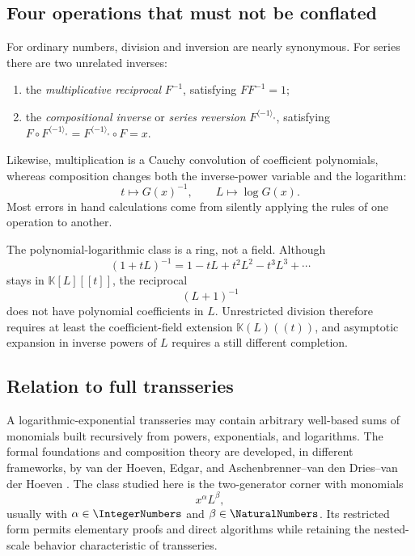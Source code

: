 \documentclass[11pt]{article}
\theoremstyle{pltheorem}
\newcommand{\K}{\mathbb K}
\newcommand{\rev}{\langle-1\rangle_{\circ}}
\newcommand{\compose}{\mathbin{\circ}}
\begin{document}
\subsection{Four operations that must not be conflated}

For ordinary numbers, division and inversion are nearly synonymous.  For series there are two unrelated inverses:
\begin{enumerate}[label=\textup{(\roman*)}]
\item the \emph{multiplicative reciprocal} \(F^{-1}\), satisfying \(F F^{-1}=1\);
\item the \emph{compositional inverse} or \emph{series reversion} \(F^{\rev}\), satisfying
\(F\compose F^{\rev}=F^{\rev}\compose F=x\).
\end{enumerate}
Likewise, multiplication is a Cauchy convolution of coefficient polynomials, whereas composition changes both the inverse-power variable and the logarithm:
\[
 t\mapsto G(x)^{-1},\qquad L\mapsto\log G(x).
\]
Most errors in hand calculations come from silently applying the rules of one operation to another.

\begin{warningbox}
The polynomial-logarithmic class is a ring, not a field.  Although
\[
 (1+tL)^{-1}=1-tL+t^2L^2-t^3L^3+\cdots
\]
stays in \(\K[L][[t]]\), the reciprocal
\[
 (L+1)^{-1}
\]
does not have polynomial coefficients in \(L\).  Unrestricted division therefore requires at least the coefficient-field extension \(\K(L)((t))\), and asymptotic expansion in inverse powers of \(L\) requires a still different completion.
\end{warningbox}

\subsection{Relation to full transseries}

A logarithmic-exponential transseries may contain arbitrary well-based sums of monomials built recursively from powers, exponentials, and logarithms.  The formal foundations and composition theory are developed, in different frameworks, by van der Hoeven, Edgar, and Aschenbrenner--van den Dries--van der Hoeven \cite{vanderhoeven-book,edgar-beginners,edgar-composition,adh-book}.  The class studied here is the two-generator corner with monomials
\begin{equation}\label{eq:power-log-monomials}
 x^\alpha L^\beta,
\end{equation}
usually with \(\alpha\in\IntegerNumbers\) and \(\beta\in\NaturalNumbers\).  Its restricted form permits elementary proofs and direct algorithms while retaining the nested-scale behavior characteristic of transseries.
\end{document}
